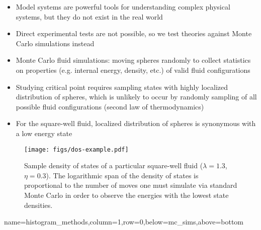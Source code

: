 \documentclass[paperwidth=48in,paperheight=36in,
fontscale=0.27,margin=0.75in]{baposter}
\begin{document}
\begin{poster}
{    %


    \begin{itemize}
    \item Model systems are powerful tools for understanding complex
      physical systems, but they do not exist in the real world
    \item Direct experimental tests are not possible, so we test
      theories against Monte Carlo simulations instead
    \item Monte Carlo fluid simulations: moving spheres randomly to
      collect statistics on properties (e.g. internal energy, density,
      etc.) of valid fluid configurations
    \item Studying critical point requires sampling states with highly
      localized distribution of spheres, which is unlikely to occur by
      randomly sampling of all possible fluid configurations (second
      law of thermodynamics)
    \item For the square-well fluid, localized distribution of spheres
      is synonymous with a low energy state
    \end{itemize}

    \begin{figure}[H]
      \centering
      \texttt{[image: figs/dos-example.pdf]}
      \caption{Sample density of states of a particular square-well
        fluid ($\lambda=1.3$, $\eta=0.3$). The logarithmic span of the
        density of states is proportional to the number of moves one
        must simulate via standard Monte Carlo in order to observe the
        energies with the lowest state densities.}
      \label{fig:dos}
    \end{figure}

  }

  {name=histogram_methods,column=1,row=0,below=mc_sims,above=bottom} {%

}
\end{poster}
\end{document}
